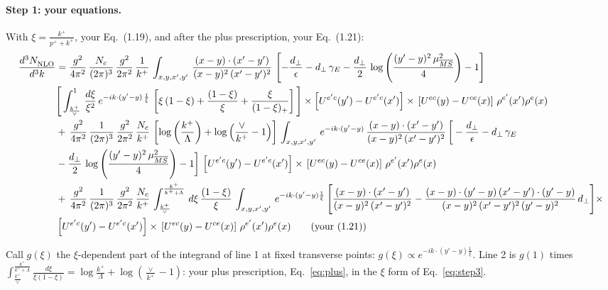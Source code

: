 \documentclass[10pt]{article}
\numberwithin{equation}{section}
\begin{document}
\paragraph{Step 1: your equations.} With $\xi=\frac{k^+}{p^++k^+}$, your Eq.~(1.19), and after the plus prescription, your Eq.~(1.21):
\begin{align}
    \frac{d^{3}N_{\rm NLO}^{\rm}}{d^{3}k}  & = \frac{g^{2}}{4\pi^{2}}\, \frac{N_{c}}{(2\pi)^{3}}\,\frac{g^{2}}{2\pi^{2}}\, \frac{1}{k^{+}}\,\int_{x,y,x',y'}\,\frac{(x-y)\cdot (x'-y')}{(x-y)^{2}\,(x'-y')^{2}}\,\left[-\frac{d_{\perp}}{\epsilon}-d_{\perp}\,\gamma_{E}-\frac{d_{\perp}}{2}\,\log{\left(\frac{(y'-y)^{2}\,\mu^{2}_{\overline{MS}}}{4}\right)}-1\right]\,\notag \\ & \Bigg[\int_{\frac{k^{+}}{\vee}}^{1}\,\frac{d\xi}{\xi^{2}}\,e^{-ik\cdot (y'-y)\,\frac{1}{\xi}}\,\left[\xi\,(1-\xi)+\frac{(1-\xi)}{\xi}+\frac{\xi}{(1-\xi)_{+}}\right]\Bigg]\times \left[U^{e'c}(y') - U^{e'c}(x')\right] \times\, \left[U^{ec}(y) - U^{ce}(x)\right]\, \rho^{e'}(x') \rho^{e}(x)\notag \\ &  +\, \frac{g^{2}}{4\pi^{2}}\, \frac{1}{(2\pi)^{3}}\,\frac{g^{2}}{2\pi^{2}}\, \frac{N_{c}}{k^{+}}\,\left[\log{\left(\frac{k^{+}}{\Lambda}\right)}+\log{\left(\frac{\vee}{k^{+}}-1\right)}\right]\,\int_{x,y,x',y'}\,e^{-ik\cdot (y'-y)}\,\frac{(x-y)\cdot (x'-y')}{(x-y)^{2}\,(x'-y')^{2}}\,\bigg[-\frac{d_{\perp}}{\epsilon}-d_{\perp}\,\gamma_{E}\notag \\ & -\frac{d_{\perp}}{2}\,\log{\left(\frac{(y'-y)^{2}\,\mu^{2}_{\overline{MS}}}{4}\right)}-1\bigg]\,\left[U^{e'c}(y') - U^{e'c}(x')\right] \times\, \left[U^{ec}(y) - U^{ce}(x)\right]\, \rho^{e'}(x') \rho^{e}(x)\notag \\ & +\,\frac{g^{2}}{4\pi^{2}}\, \frac{1}{(2\pi)^{3}}\,\frac{g^{2}}{2\pi^{2}}\, \frac{N_{c}}{k^{+}}\,\int_{\frac{k^{+}}{\vee}}^{\frac{k^{+}}{k^{+}+\Lambda}}\,d\xi\, \frac{(1-\xi)}{\xi}\, \int_{x,y,x',y'}\,e^{-ik\cdot (y'-y)\frac{1}{\xi}}\,\Bigg[\frac{(x-y)\cdot (x'-y')}{(x-y)^{2}\, (x'-y')^{2}} -\frac{(x-y)\cdot (y'-y)\, (x'-y')\cdot (y'-y)}{(x-y)^{2}\,(x'-y')^{2}\,(y'-y)^{2}}\,d_{\perp}\Bigg]\times\notag \\ &  \left[U^{e'c}(y') - U^{e'c}(x')\right] \times\, \left[U^{ec}(y) - U^{ce}(x)\right]\, \rho^{e'}(x') \rho^{e}(x)\tag{your (1.21)}
\end{align}

Call $g(\xi)$ the $\xi$-dependent part of the integrand of line 1 at fixed transverse points: $g(\xi)\propto e^{-ik\cdot(y'-y)\frac1\xi}$. Line 2 is $g(1)$ times $\int_{\frac{k^+}{\vee}}^{\frac{k^+}{k^++\Lambda}}\frac{d\xi}{\xi(1-\xi)}=\log\frac{k^+}{\Lambda}+\log(\frac{\vee}{k^+}-1)$: your plus prescription, Eq.~\eqref{eq:plus}, in the $\xi$ form of Eq.~\eqref{eq:step3}.
\end{document}

